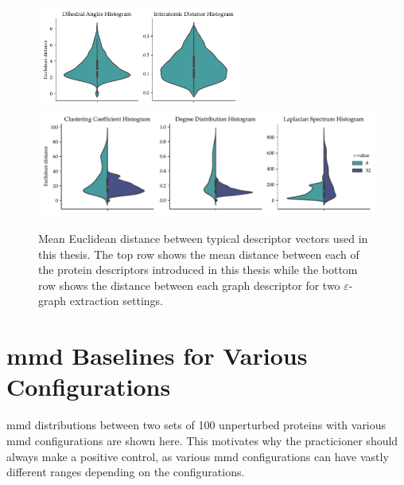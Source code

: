 \begin{figure}
  \centering
  \includegraphics[width=0.6\textwidth]{./figures/results/violin_protein_descriptors.pdf}
  \includegraphics[width=\textwidth]{./figures/results/violin_graph_descriptors.pdf}
  \caption[Mean Euclidean distance between typical descriptor vectors used in
  this thesis]{Mean Euclidean distance between typical descriptor vectors used in
this thesis. The top row shows the mean distance between each of the protein
descriptors introduced in this thesis while the bottom row shows the distance
between each graph descriptor for two $\varepsilon$-graph extraction settings.}
  \label{fig:mean_distance_embedding}
\end{figure} %

\clearpage
\section{\gls{mmd} Baselines for Various Configurations}\label{sec:mmd_baselines}
\gls{mmd} distributions between two sets of 100 unperturbed proteins with
various \gls{mmd} configurations are shown here. This motivates why the
practicioner should always make a positive control, as various \gls{mmd}
configurations can have vastly different ranges depending on the configurations.

